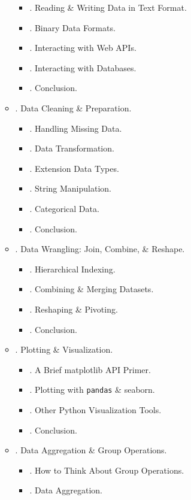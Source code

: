 \documentclass{article}
\begin{document}
\begin{enumerate}
\begin{itemize}
		\begin{itemize}
			\item {. Reading \& Writing Data in Text Format.}
			\item {. Binary Data Formats.}
			\item {. Interacting with Web APIs.}
			\item {. Interacting with Databases.}
			\item {. Conclusion.}
		\end{itemize}
		\item {. Data Cleaning \& Preparation.}
		\begin{itemize}
			\item {. Handling Missing Data.}
			\item {. Data Transformation.}
			\item {. Extension Data Types.}
			\item {. String Manipulation.}
			\item {. Categorical Data.}
			\item {. Conclusion.}
		\end{itemize}
		\item {. Data Wrangling: Join, Combine, \& Reshape.}
		\begin{itemize}
			\item {. Hierarchical Indexing.}
			\item {. Combining \& Merging Datasets.}
			\item {. Reshaping \& Pivoting.}
			\item {. Conclusion.}
		\end{itemize}
		\item {. Plotting \& Visualization.}
		\begin{itemize}
			\item {. A Brief matplotlib API Primer.}
			\item {. Plotting with {\tt pandas} \& seaborn.}
			\item {. Other Python Visualization Tools.}
			\item {. Conclusion.}
		\end{itemize}
		\item {. Data Aggregation \& Group Operations.}
		\begin{itemize}
			\item {. How to Think About Group Operations.}
			\item {. Data Aggregation.}

\end{itemize}
\end{itemize}
\end{enumerate}
\end{document}
